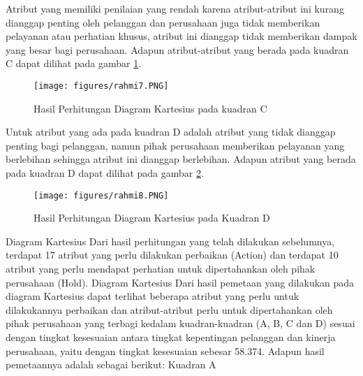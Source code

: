 Atribut yang memiliki penilaian yang rendah karena atribut-atribut ini kurang dianggap penting oleh pelanggan dan perusahaan juga tidak memberikan pelayanan atau perhatian khusus, 
atribut ini dianggap tidak memberikan dampak yang besar bagi perusahaan.
Adapun atribut-atribut yang berada pada kuadran C dapat dilihat pada gambar \ref{rahmi7}.

\begin{figure}[ht]
	\centerline{\texttt{[image: figures/rahmi7.PNG]}}
	\caption{Hasil Perhitungan Diagram Kartesius pada kuadran C}
	\label{rahmi7}
	\end{figure}

Untuk atribut yang ada pada kuadran D adalah atribut yang tidak dianggap penting bagi pelanggan, namun pihak perusahaan memberikan pelayanan yang berlebihan 
sehingga atribut ini dianggap berlebihan.
Adapun atribut yang berada pada kuadran D dapat dilihat pada gambar \ref{rahmi8}.	
\begin{figure}[ht]
	\centerline{\texttt{[image: figures/rahmi8.PNG]}}
	\caption{Hasil Perhitungan Diagram Kartesius pada Kuadran D}
	\label{rahmi8}
	\end{figure}



Diagram Kartesius
Dari hasil perhitungan yang telah dilakukan sebelumnya, terdapat 17 atribut yang perlu dilakukan perbaikan (Action) dan terdapat 10 atribut yang perlu mendapat
perhatian untuk dipertahankan oleh pihak perusahaan (Hold). Diagram Kartesius Dari hasil pemetaan yang dilakukan pada diagram Kartesius dapat terlihat beberapa
atribut yang perlu untuk dilakukannya perbaikan dan atribut-atribut perlu untuk dipertahankan oleh pihak perusahaan yang terbagi kedalam kuadran-kuadran (A, B, C
dan D) sesuai dengan tingkat kesesuaian antara tingkat kepentingan pelanggan dan kinerja perusahaan, yaitu dengan tingkat kesesuaian sebesar 58.374.
Adapun hasil pemetaannya adalah sebagai berikut:
Kuadran A

